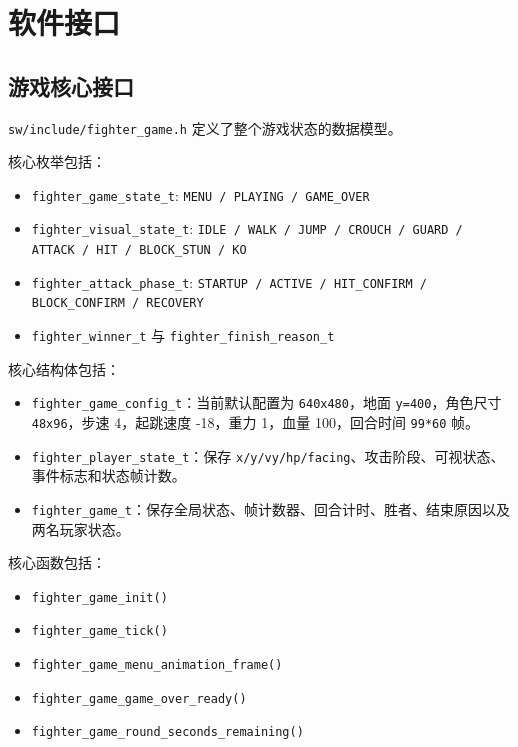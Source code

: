 \documentclass[12pt,a4paper]{ctexart}
\begin{document}
\section{软件接口}

\subsection{游戏核心接口}

\texttt{sw/include/fighter\_game.h} 定义了整个游戏状态的数据模型。

核心枚举包括：

\begin{itemize}
  \item \texttt{fighter\_game\_state\_t}: \texttt{MENU / PLAYING / GAME\_OVER}
  \item \texttt{fighter\_visual\_state\_t}: \texttt{IDLE / WALK / JUMP / CROUCH / GUARD / ATTACK / HIT / BLOCK\_STUN / KO}
  \item \texttt{fighter\_attack\_phase\_t}: \texttt{STARTUP / ACTIVE / HIT\_CONFIRM / BLOCK\_CONFIRM / RECOVERY}
  \item \texttt{fighter\_winner\_t} 与 \texttt{fighter\_finish\_reason\_t}
\end{itemize}

核心结构体包括：

\begin{itemize}
  \item \texttt{fighter\_game\_config\_t}：当前默认配置为 \texttt{640x480}，地面 \texttt{y=400}，角色尺寸 \texttt{48x96}，步速 4，起跳速度 -18，重力 1，血量 100，回合时间 \texttt{99*60} 帧。
  \item \texttt{fighter\_player\_state\_t}：保存 \texttt{x/y/vy/hp/facing}、攻击阶段、可视状态、事件标志和状态帧计数。
  \item \texttt{fighter\_game\_t}：保存全局状态、帧计数器、回合计时、胜者、结束原因以及两名玩家状态。
\end{itemize}

核心函数包括：

\begin{itemize}
  \item \texttt{fighter\_game\_init()}
  \item \texttt{fighter\_game\_tick()}
  \item \texttt{fighter\_game\_menu\_animation\_frame()}
  \item \texttt{fighter\_game\_game\_over\_ready()}
  \item \texttt{fighter\_game\_round\_seconds\_remaining()}
\end{itemize}
\end{document}
